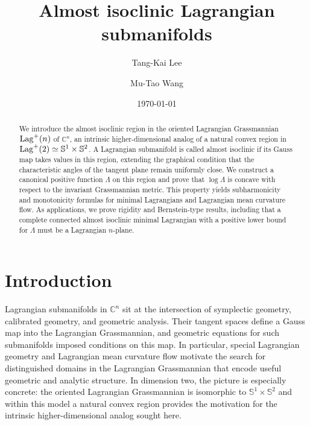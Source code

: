 \documentclass[11pt]{amsart}
\title{Almost isoclinic Lagrangian submanifolds
}
\author{Tang-Kai Lee}
\author{Mu-Tao Wang}
\date{\today}
\numberwithin{equation}{section}
\theoremstyle{definition}
\theoremstyle{definition}
\begin{document}
\begin{abstract}
We introduce the almost isoclinic region in the oriented Lagrangian Grassmannian ${\rm Lag}^+(n)$ of $\mathbb{C}^n$, an intrinsic higher-dimensional analog of a natural convex region in ${\rm Lag}^+(2) \simeq \mathbb S^1\times \mathbb S^2$. 
A Lagrangian submanifold is called almost isoclinic if its Gauss map takes values in this region, extending the graphical condition that the characteristic angles of the tangent plane remain uniformly close. 
We construct a canonical positive function $\Lambda$ on this region and prove that $\log \Lambda $ is concave with respect to the invariant Grassmannian metric. 
This property yields subharmonicity and monotonicity formulas for minimal Lagrangians and Lagrangian mean curvature flow. 
As applications, we prove rigidity and Bernstein-type results, including that a complete connected almost isoclinic minimal Lagrangian with a positive lower bound for $\Lambda$ must be a Lagrangian $n$-plane.
\end{abstract}

\maketitle

\section{\bf Introduction}


Lagrangian submanifolds in $\mathbb{C}^n$ sit at the intersection of symplectic geometry, calibrated geometry, and geometric analysis. Their tangent spaces define a Gauss map into the Lagrangian Grassmannian, and geometric equations for such submanifolds imposed conditions on this map. 
In particular, special Lagrangian geometry and Lagrangian mean curvature flow motivate the search for distinguished domains in the Lagrangian Grassmannian that encode useful geometric and analytic structure. 
In dimension two, the picture is especially concrete: the oriented Lagrangian Grassmannian is isomorphic to $\mathbb S^1\times \mathbb S^2$ and within this model a natural convex region provides the motivation  for the intrinsic higher-dimensional analog sought here.
\end{document}
